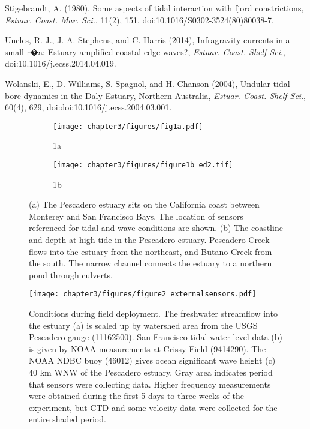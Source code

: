 \begin{thebibliography}{\textit{Ranasinghe and Patttiaratchi}(2003)}
Stigebrandt,
A. (1980), Some aspects of tidal interaction with fjord constrictions,
\emph{Estuar. Coast. Mar. Sci.}, 11(2), 151, doi:10.1016/S0302-3524(80)80038-7. 

Uncles, R.
J., J. A. Stephens, and C. Harris (2014), Infragravity currents in
a small r�a: Estuary-amplified coastal edge waves?, \emph{Estuar.
Coast. Shelf Sci}., doi:10.1016/j.ecss.2014.04.019. 

Wolanski,
E., D. Williams, S. Spagnol, and H. Chanson (2004), Undular tidal
bore dynamics in the Daly Estuary, Northern Australia, \emph{Estuar.
Coast. Shelf Sci}., 60(4), 629, doi:doi:10.1016/j.ecss.2004.03.001. 

\end{thebibliography}



\begin{figure}[t]
\begin{subfigure}{.5\textwith}
	\centering
	\texttt{[image: chapter3/figures/fig1a.pdf]}
	\caption{1a}
	\label{fig:sfig1a_coastline}
\end{subfigure}
\begin{subfigure}{.5\textwith}
	\centering
	\texttt{[image: chapter3/figures/figure1b\_ed2.tif]}
	\caption{1b}
	\label{fig:sfig1b_pdomap}
\end{subfigure}
\caption{(a) The Pescadero estuary sits on the California coast between Monterey
and San Francisco Bays. The location of sensors referenced for tidal
and wave conditions are shown. (b) The coastline and depth at high
tide in the Pescadero estuary. Pescadero Creek flows into the estuary
from the northeast, and Butano Creek from the south. The narrow channel
connects the estuary to a northern pond through culverts.}
\label{f1_maps}
\end{figure}


\begin{figure}
\texttt{[image: chapter3/figures/figure2\_externalsensors.pdf]}

\protect\caption{Conditions during field deployment. The freshwater streamflow into
the estuary (a) is scaled up by watershed area from the USGS Pescadero
gauge (11162500). San Francisco tidal water level data (b) is given
by NOAA measurements at Crissy Field (9414290). The NOAA NDBC buoy
(46012) gives ocean significant wave height (c) 40 km WNW of the Pescadero
estuary. Gray area indicates period that sensors were collecting data.
Higher frequency measurements were obtained during the first 5 days
to three weeks of the experiment, but CTD and some velocity data were
collected for the entire shaded period. \label{f2_QTHs}}


\end{figure}


